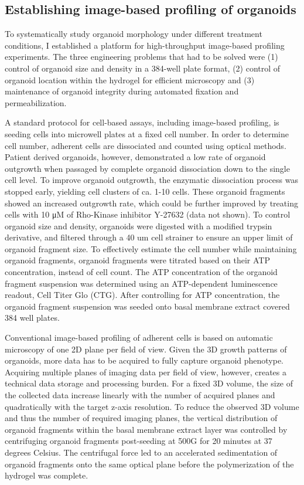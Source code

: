 \begin{flushleft}
\subsection{Establishing image-based profiling of organoids}
To systematically study organoid morphology under different treatment conditions, I established a platform for high-throughput image-based profiling experiments. The three engineering problems that had to be solved were (1) control of organoid size and density in a 384-well plate format, (2) control of organoid location within the hydrogel for efficient microscopy and (3) maintenance of organoid integrity during automated fixation and permeabilization. 


A standard protocol for cell-based assays, including image-based profiling, is seeding cells into microwell plates at a fixed cell number. In order to determine cell number, adherent cells are dissociated and counted using optical methods. Patient derived organoids, however, demonstrated a low rate of organoid outgrowth when passaged by complete organoid dissociation down to the single cell level. To improve organoid outgrowth, the enzymatic dissociation process was stopped early, yielding cell clusters of ca. 1-10 cells. These organoid fragments showed an increased outgrowth rate, which could be further improved by treating cells with 10 μM of Rho-Kinase inhibitor Y-27632 (data not shown). To control organoid size and density, organoids were digested with a modified trypsin derivative, and filtered through a 40 um cell strainer to ensure an upper limit of organoid fragment size. To effectively estimate the cell number while maintaining organoid fragments, organoid fragments were titrated based on their ATP concentration, instead of cell count. The ATP concentration of the organoid fragment suspension was determined using an ATP-dependent luminescence readout, Cell Titer Glo (CTG). After controlling for ATP concentration, the organoid fragment suspension was seeded onto basal membrane extract covered 384 well plates.
\bigbreak

Conventional image-based profiling of adherent cells is based on automatic microscopy of one 2D plane per field of view. Given the 3D growth patterns of organoids, more data has to be acquired to fully capture organoid phenotype. Acquiring multiple planes of imaging data per field of view, however, creates a technical data storage and processing burden. For a fixed 3D volume, the size of the collected data increase linearly with the number of acquired planes and quadratically with the target z-axis resolution. To reduce the observed 3D volume and thus the number of required imaging planes, the vertical distribution of organoid fragments within the basal membrane extract layer was controlled by centrifuging organoid fragments post-seeding at 500G for 20 minutes at 37 degrees Celsius. The centrifugal force led to an accelerated sedimentation of organoid fragments onto the same optical plane before the polymerization of the hydrogel was complete.
\bigbreak


\end{flushleft}
